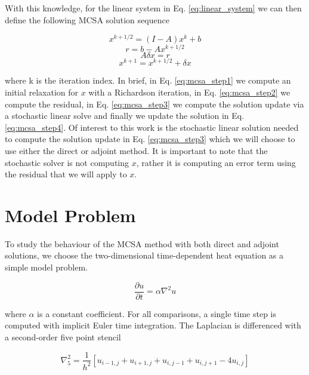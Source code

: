 \documentclass[note]{TechNote}
\begin{document}
With this knowledge, for the linear system in
Eq. \ref{eq:linear_system} we can then define the following MCSA
solution sequence

\begin{equation}
  x^{k+1/2} = (I-A)x^k + b
  \label{eq:mcsa_step1}
\end{equation}
\begin{equation}
  r = b - A x^{k+1/2}
  \label{eq:mcsa_step2}
\end{equation}
\begin{equation}
  A \delta x = r
  \label{eq:mcsa_step3}
\end{equation}
\begin{equation}
  x^{k+1} = x^{k+1/2} + \delta x
  \label{eq:mcsa_step4}
\end{equation}

where k is the iteration index. In brief, in Eq. \ref{eq:mcsa_step1}
we compute an initial relaxation for $x$ with a Richardson iteration,
in Eq. \ref{eq:mcsa_step2} we compute the residual, in
Eq. \ref{eq:mcsa_step3} we compute the solution update via a
stochastic linear solve and finally we update the solution in
Eq. \ref{eq:mcsa_step4}. Of interest to this work is the stochastic
linear solution needed to compute the solution update in Eq.
\ref{eq:mcsa_step3} which we will choose to use either the direct or
adjoint method. It is important to note that the stochastic solver is
not computing $x$, rather it is computing an error term using the
residual that we will apply to $x$.

\section{Model Problem}
To study the behaviour of the MCSA method with both direct and adjoint
solutions, we choose the two-dimensional time-dependent heat equation
as a simple model problem.

\begin{equation}
  \frac{\partial u}{\partial t} = \alpha \nabla^2 u
  \label{eq:heat_equation}
\end{equation}

where $\alpha$ is a constant coefficient. For all comparisons, a
single time step is computed with implicit Euler time integration. The
Laplacian is differenced with a second-order five point stencil

\begin{equation}
  \nabla^2_5 = \frac{1}{h^2}[u_{i-1,j} + u_{i+1,j} + u_{i,j-1} +
  u_{i,j+1} - 4 u_{i,j}]
  \label{eq:five_point_stencil}
\end{equation}
\end{document}
